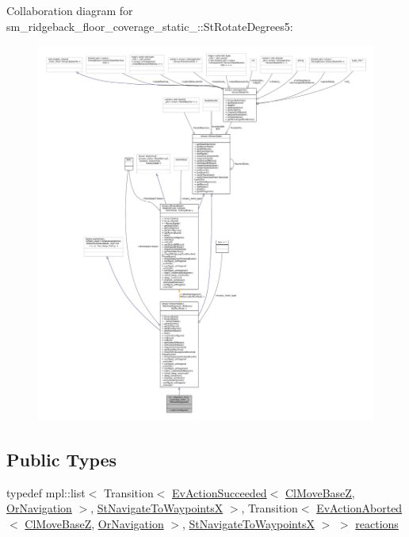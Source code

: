 Collaboration diagram for sm\+\_\+ridgeback\+\_\+floor\+\_\+coverage\+\_\+static\+\_\+:\+:St\+Rotate\+Degrees5\+:
\nopagebreak
\begin{figure}[H]
\begin{center}
\leavevmode
\includegraphics[width=350pt]{structsm__ridgeback__floor__coverage__static__1_1_1StRotateDegrees5__coll__graph}
\end{center}
\end{figure}
\subsection*{Public Types}
\begin{DoxyCompactItemize}
\item 
typedef mpl\+::list$<$ Transition$<$ \hyperlink{structsmacc_1_1default__events_1_1EvActionSucceeded}{Ev\+Action\+Succeeded}$<$ \hyperlink{classcl__move__base__z_1_1ClMoveBaseZ}{Cl\+Move\+BaseZ}, \hyperlink{classsm__ridgeback__floor__coverage__static__1_1_1OrNavigation}{Or\+Navigation} $>$, \hyperlink{structsm__ridgeback__floor__coverage__static__1_1_1StNavigateToWaypointsX}{St\+Navigate\+To\+WaypointsX} $>$, Transition$<$ \hyperlink{structsmacc_1_1default__events_1_1EvActionAborted}{Ev\+Action\+Aborted}$<$ \hyperlink{classcl__move__base__z_1_1ClMoveBaseZ}{Cl\+Move\+BaseZ}, \hyperlink{classsm__ridgeback__floor__coverage__static__1_1_1OrNavigation}{Or\+Navigation} $>$, \hyperlink{structsm__ridgeback__floor__coverage__static__1_1_1StNavigateToWaypointsX}{St\+Navigate\+To\+WaypointsX} $>$ $>$ \hyperlink{structsm__ridgeback__floor__coverage__static__1_1_1StRotateDegrees5_a0d4965eaff344d4eeba204d5561cb309}{reactions}
\end{DoxyCompactItemize}
